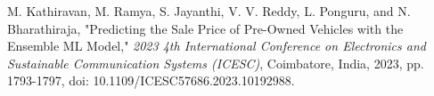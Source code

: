 \documentclass[a4paper,12pt]{article}
\begin{document}
\begin{justify}
\begin{thebibliography}{9}
M. Kathiravan, M. Ramya, S. Jayanthi, V. V. Reddy, L. Ponguru, and N. Bharathiraja, "Predicting the Sale Price of Pre-Owned Vehicles with the Ensemble ML Model," \textit{2023 4th International Conference on Electronics and Sustainable Communication Systems (ICESC)}, Coimbatore, India, 2023, pp. 1793-1797, doi: 10.1109/ICESC57686.2023.10192988.


\end{thebibliography}

\end{justify}
\end{document}
